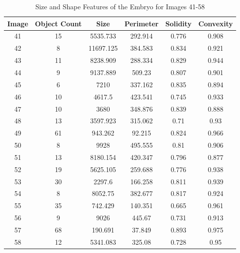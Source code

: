 \documentclass{article}
\begin{document}
\begin{table}[h!]
    \centering
    \begin{tabular}{|c|c|c|c|c|c|}
    \hline
        Image & Object Count & Size & Perimeter & Solidity & Convexity \\ \hline
        41 & 15&5535.733&292.914&0.776&0.908    \\ \hline
        42&8&11697.125&384.583&0.834&0.921   \\ \hline
        43&11&8238.909&288.334&0.829&0.944   \\ \hline
        44&9&9137.889&509.23&0.807&0.901   \\ \hline
        45&6&7210&337.162&0.835&0.894   \\ \hline
        46&10&4617.5&423.541&0.745&0.933   \\ \hline
        47&10&3680&348.876&0.839&0.888   \\ \hline
        48&13&3597.923&315.062&0.71&0.93   \\ \hline
        49&61&943.262&92.215&0.824&0.966   \\ \hline
        50&8&9928&495.555&0.81&0.906   \\ \hline
        51&13&8180.154&420.347&0.796&0.877   \\ \hline
        52&19&5625.105&259.688&0.776&0.938   \\ \hline
        53&30&2297.6&166.258&0.811&0.939   \\ \hline
        54&8&8052.75&382.677&0.817&0.924   \\ \hline
        55&35&742.429&140.351&0.665&0.961   \\ \hline
        56&9&9026&445.67&0.731&0.913   \\ \hline
        57&68&190.691&37.849&0.893&0.975   \\ \hline
        58&12&5341.083&325.08&0.728&0.95   \\ \hline
    \end{tabular}
    \caption{Size and Shape Features of the Embryo for Images 41-58}
    \label{tab:size_shape_pt1}
\end{table}
\end{document}
